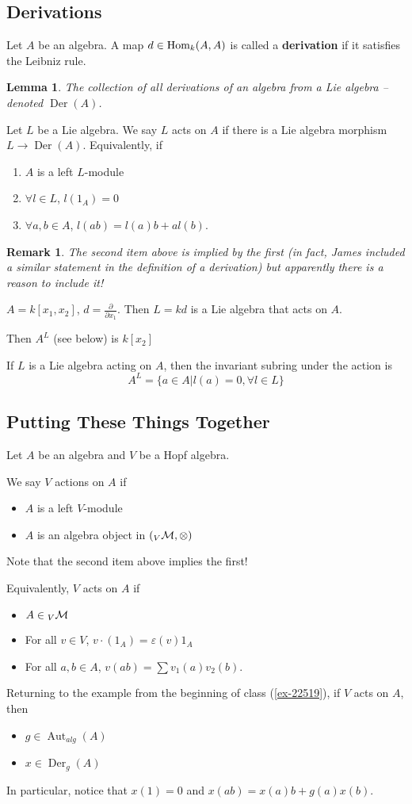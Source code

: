 \documentclass[12pt]{article}
\theoremstyle{break}
\theoremstyle{nonumberbreak}
\theoremstyle{changebreak}
\newtheorem{lem}[thm]{Lemma}
\theoremstyle{break}
\theoremstyle{nonumberbreak}
\theoremstyle{nonumberplain}
\theoremstyle{change}
\newtheorem{rmk}[thm]{Remark}
\DeclareMathOperator{\Aut}{Aut}
\newcommand*{\Hom}{\ensuremath\text{Hom}}
\DeclareMathOperator{\Der}{Der}
\begin{document}
\subsection{Derivations}
\begin{defn}
	Let $A$ be an algebra. A map $d\in\Hom_k(A,A)$ is called a \textbf{derivation} if
	it satisfies the Leibniz rule.
\end{defn}
\begin{lem}
	The collection of all derivations of an algebra from a Lie algebra -- denoted $\Der(A)$.
\end{lem}
\begin{defn}
	Let $L$ be a Lie algebra. We say $L$ acts on $A$ if there is a Lie algebra morphism $L\to \Der(A)$.
	Equivalently, if
	\begin{enumerate}
		\item $A$ is a left $L$-module
		\item $\forall l\in L$, $l(1_A)=0$
		\item $\forall a,b\in A$, $l(ab)=l(a)b+al(b)$.
	\end{enumerate}
\end{defn}
\begin{rmk}
	The second item above is implied by the first (in fact, James included a similar statement in 
	the definition of a derivation) but apparently there is a reason to include it!
\end{rmk}
\begin{ex}
	$A=k[x_1,x_2]$, $d=\frac{\partial}{\partial x_1}$. Then $L=kd$ is a Lie algebra that acts on $A$.

	Then $A^L$ (see below) is $k[x_2]$
\end{ex}
\begin{defn}
	If $L$ is a Lie algebra acting on $A$, then the invariant subring under the action is
	\[A^L=\{a\in A|l(a)=0,\forall l\in L\}\]
\end{defn}

\subsection{Putting These Things Together}
Let $A$ be an algebra and $V$ be a Hopf algebra.
\begin{defn}
	We say $V$ actions on $A$ if
	\begin{itemize}
		\item $A$ is a left $V$-module
		\item $A$ is an algebra object in $({_V\cal M},\otimes)$
	\end{itemize}
	Note that the second item above implies the first!

	Equivalently, $V$ acts on $A$ if
	\begin{itemize}
		\item $A\in {_V\cal M}$
		\item For all $v\in V$, $v\cdot(1_A)=\varepsilon(v)1_A$
		\item For all $a,b\in A$, $v(ab)=\sum v_1(a)v_2(b)$.
	\end{itemize}
\end{defn}

Returning to the example from the beginning of class (\ref{ex-22519}), if $V$ acts on $A$,
then 
\begin{itemize}
	\item $g\in \Aut_{alg}(A)$
	\item $x\in\Der_g(A)$
\end{itemize}
In particular, notice that $x(1)=0$ and $x(ab)=x(a)b+g(a)x(b)$.
\end{document}

